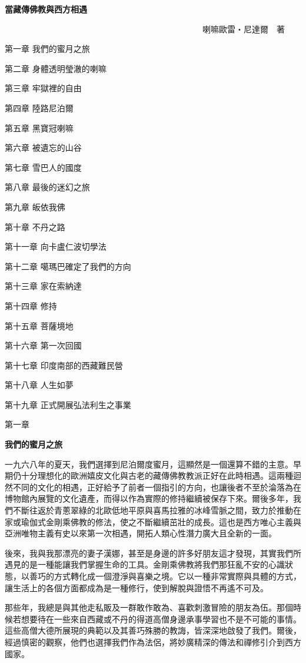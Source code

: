 \textbf{當藏傳佛教與西方相遇}

　　　　　　　　　　　　　　　　　　　　　　　　喇嘛歐雷‧尼達爾　著

第一章 我們的蜜月之旅

第二章 身體透明瑩澈的喇嘛

第三章 牢獄裡的自由

第四章 陸路尼泊爾

第五章 黑寶冠喇嘛

第六章 被遺忘的山谷

第七章 雪巴人的國度

第八章 最後的迷幻之旅

第九章 皈依我佛

第十章 不丹之路

第十一章 向卡盧仁波切學法

第十二章 噶瑪巴確定了我們的方向

第十三章 家在索納達

第十四章 修持

第十五章 菩薩境地

第十六章 第一次回國

第十七章 印度南部的西藏難民營

第十八章 人生如夢

第十九章 正式開展弘法利生之事業

第一章

\textbf{我們的蜜月之旅}

一九六八年的夏天，我們選擇到尼泊爾度蜜月，這顯然是一個還算不錯的主意。早期仍十分理想化的歐洲嬉皮文化與古老的藏傳佛教教派正好在此時相遇。這兩種迴然不同的文化的相遇，正好給予了前者一個指引的方向，也讓後者不至於淪落為在博物館內展覽的文化遺產，而得以作為實際的修持繼續被保存下來。爾後多年，我們不斷往返於青蔥翠綠的北歐低地平原與喜馬拉雅的冰峰雪脈之間，致力於推動在家或瑜伽式金剛乘佛教的修法，使之不斷繼續茁壯的成長。這也是西方唯心主義與亞洲唯物主義有史以來第一次相遇，開拓人類心性潛力廣大且全新的一面。

後來，我與我那漂亮的妻子漢娜，甚至是身邊的許多好朋友這才發現，其實我們所遇見的是一種能讓我們掌握生命的工具。金剛乘佛教將我們那狂亂不安的心識狀態，以善巧的方式轉化成一個澄淨與喜樂之境。它以一種非常實際與具體的方式，讓生活上的各個方面都成為是一種修行，使到解脫與證悟不再遙不可及。

那些年，我總是與其他走私販及一群敢作敢為、喜歡刺激冒險的朋友為伍。那個時候若想要待在一些來自西藏或不丹的得道高僧身邊承事學習也不是不可能的事情。這些高僧大德所展現的典範以及其善巧殊勝的教誨，皆深深地啟發了我們。爾後，經過慎密的觀察，他們也選擇我們作為法侶，將妙廣精深的傳法和禪修引介到西方國家。

